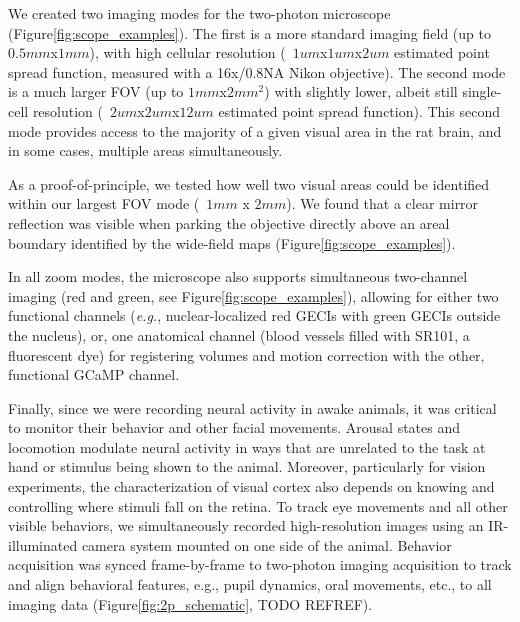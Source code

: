 We created two imaging modes for the two-photon microscope (Figure\ref{fig:scope_examples}). The first is a more standard imaging field (up to $0.5mm$x$1mm$), with high cellular resolution (~$1um$x$1um$x$2um$ estimated point spread function, measured with a 16x/0.8NA Nikon objective). The second mode is a much larger FOV (up to $1mm$x$2mm^2$) with slightly lower, albeit still single-cell resolution (~$2um$x$2um$x$12um$ estimated point spread function). This second mode provides access to the majority of a given visual area in the rat brain, and in some cases, multiple areas simultaneously. 

As a proof-of-principle, we tested how well two visual areas could be identified within our largest FOV mode (~$1mm$ x $2mm$). We found that a clear mirror reflection was visible when parking the objective directly above an areal boundary identified by the wide-field maps (Figure\ref{fig:scope_examples}). 

In all zoom modes, the microscope also supports simultaneous two-channel imaging (red and green, see Figure\ref{fig:scope_examples}), allowing for either two functional channels (\textit{e.g.}, nuclear-localized red GECIs with green GECIs outside the nucleus), or, one anatomical channel (blood vessels filled with SR101, a fluorescent dye) for registering volumes and motion correction with the other, functional GCaMP channel. 

Finally, since we were recording neural activity in awake animals, it was critical to monitor their behavior and other facial movements. Arousal states and locomotion modulate neural activity in ways that are unrelated to the task at hand or stimulus being shown to the animal. Moreover, particularly for vision experiments, the characterization of visual cortex also depends on knowing and controlling where stimuli fall on the retina. To track eye movements and all other visible behaviors, we simultaneously recorded high-resolution images using an IR-illuminated camera system mounted on one side of the animal. Behavior acquisition was synced frame-by-frame to two-photon imaging acquisition to track and align behavioral features, e.g., pupil dynamics, oral movements, etc., to all imaging data (Figure\ref{fig:2p_schematic}, TODO REFREF).


